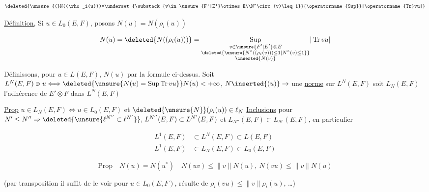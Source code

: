 \[
\deleted{\unsure{(}N((\rho_i(u)))=\underset{\substack{v\in\unsure{F'|E'}\otimes E\\N^\circ(v)\leq 1}}{\operatorname{Sup}}|\operatorname{Tr}vu|}
\]

\uline{Définition,} Si $u\in L_0(E,F)$, posons $N(u)=N(\rho_i(u))$

\[
N(u)=\deleted{N((\rho_i(u)))}=\underset{\substack{v\in\unsure{F'|E'}\otimes E\\\deleted{\unsure{N^\circ((\rho_i(v)))\leq 1|N^\circ(v)\leq1}}\\\inserted{N(v)}}}{\operatorname{Sup}}|\operatorname{Tr}vu|
\]

Définissons, pour $u\in L(E,F)$, $N(u)$ par la formule ci-dessus. Soit $L^N(E,F)\ni u\Longleftrightarrow\deleted{\unsure{N(u)=\operatorname{Sup}\operatorname{Tr}vu}}N(u)<+\infty$, $N\inserted{(u)}\to$ une \uline{norme} sur $L^N(E,F)$  soit $L_N(E,F)$ l'adhérence de $E'\otimes F$ dans $L^N(E,F)$

 \uline{Prop} $u\in L_N(E,F)\Longleftrightarrow u\in L_0(E,F)$ et $\deleted{\unsure{N}}(\rho_i(u))\in\ell_N$   \uline{Inclusions} pour $N'\leq N''\Rightarrow\deleted{\unsure{\ell^{N''}\subset\ell^{N'}}},\,L^{N''}(E,F)\subset L^{N'}(E,F)$ et $L_{N''}(E,F)\subset L_{N'}(E,F)$, en particulier

\[
\begin{aligned}
L^1(E,F)&\subset L^N(E,F)\subset L(E,F)\\
L^1(E,F)&\subset L_N(E,F)\subset L_0(E,F)
\end{aligned}
\]


\[
\text{Prop}\quad\boxed{N(u)=N(u^*)\quad N(uv)\leq\lVert v\rVert N(u),\ N(vu)\leq\lVert v\rVert N(u)}
\]

 (par transposition il suffit de le voir pour $u\in L_0(E,F)$,  résulte de $\rho_i(vu)\leq\lVert v\rVert\rho_i(u)$, \ldots)

